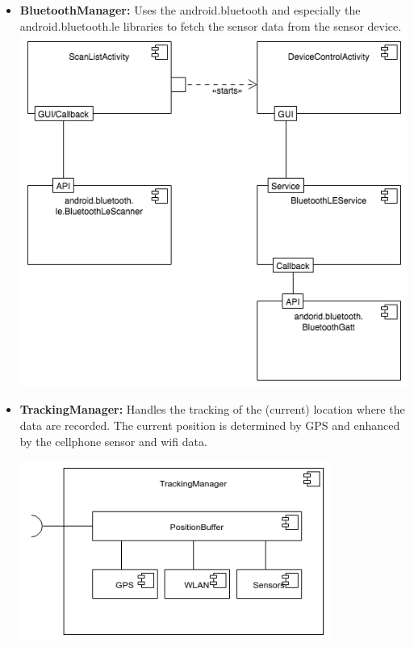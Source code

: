 \begin{itemize}
  \item \textbf{BluetoothManager:} Uses the android.bluetooth and especially the android.bluetooth.le libraries to fetch the sensor data from the sensor device. \\

 \hspace{-4cm} \includegraphics[width=1.4\textwidth]{pics/ble_man.png}

  \item \textbf{TrackingManager:} Handles the tracking of the (current) location where the data are recorded. The current position is determined by GPS and enhanced by the cellphone sensor and wifi data.

 \includegraphics[width=0.8\textwidth]{pics/TrackingManager_Composition.png}


\end{itemize}
